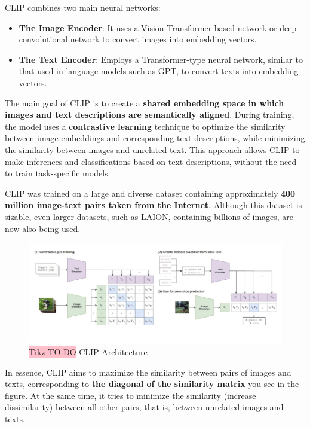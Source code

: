 CLIP combines two main neural networks:
\begin{itemize}
    \item \textbf{The Image Encoder}: It uses a Vision Transformer based network or deep convolutional network to convert images into embedding vectors.
    \item \textbf{The Text Encoder}: Employs a Transformer-type neural network, similar to that used in language models such as GPT, to convert texts into embedding vectors.
\end{itemize}

The main goal of CLIP is to create a \textbf{shared embedding space in which images and text descriptions are semantically aligned}. During training, the model uses a \textbf{contrastive learning} technique to optimize the similarity between image embeddings and corresponding text descriptions, while minimizing the similarity between images and unrelated text. This approach allows CLIP to make inferences and classifications based on text descriptions, without the need to train task-specific models.

CLIP was trained on a large and diverse dataset containing approximately \textbf{400 million image-text pairs taken from the Internet}. Although this dataset is sizable, even larger datasets, such as LAION, containing billions of images, are now also being used.

\begin{figure}[!htbp]
    \centering
    \includegraphics[width=\linewidth]{tikz/chapter11 - CLIP.png}
    \caption{{\color{red}\colorbox{pink}{Tikz TO-DO}} CLIP Architecture}
\end{figure}

In essence, CLIP aims to maximize the similarity between pairs of images and texts, corresponding to \textbf{\textcolor{mybluee}{the diagonal of the similarity matrix}} you see in the figure. At the same time, it tries to minimize the similarity (increase dissimilarity) between all other pairs, that is, between unrelated images and texts. 


